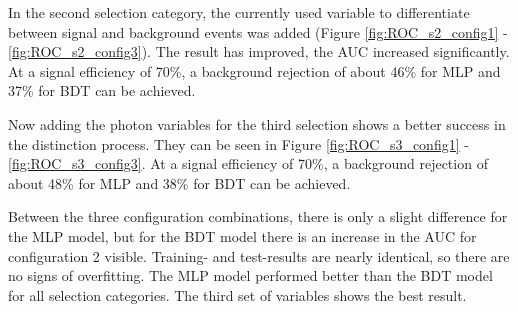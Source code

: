 \documentclass[11pt]{scrartcl}
\begin{document}
		In the second selection category, the currently used variable to differentiate between signal and background events was added (Figure \ref{fig:ROC_s2_config1} - \ref{fig:ROC_s2_config3}). The result has improved, the AUC increased significantly. At a signal efficiency of 70\%, a background rejection of about 46\% for MLP and 37\% for BDT can be achieved.
		
		Now adding the photon variables for the third selection shows a better success in the distinction process. They can be seen in Figure \ref{fig:ROC_s3_config1} - \ref{fig:ROC_s3_config3}. At a signal efficiency of 70\%, a background rejection of about 48\% for MLP and 38\% for BDT can be achieved.
		
		Between the three configuration combinations, there is only a slight difference for the MLP model, but for the BDT model there is an increase in the AUC for configuration 2 visible. Training- and test-results are nearly identical, so there are no signs of overfitting. The MLP model performed better than the BDT model for all selection categories. The third set of variables shows the best result.
				
\end{document}
